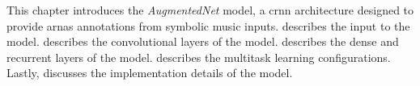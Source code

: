 

This chapter introduces the \emph{AugmentedNet} model, a
\gls{crnn} architecture designed to provide \glspl{arna}
annotations from symbolic music inputs. 
describes the input to the model.
 describes the
convolutional layers of the model.
 describes the dense and
recurrent layers of the model.
 describes the
multitask learning configurations. Lastly,
 discusses the implementation details
of the model.

